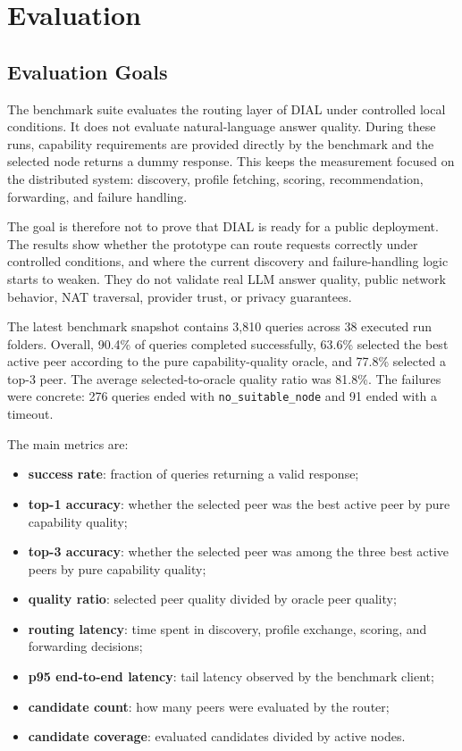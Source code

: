 \section{Evaluation}

\subsection{Evaluation Goals}

The benchmark suite evaluates the routing layer of DIAL under controlled local
conditions. It does not evaluate natural-language answer quality. During these
runs, capability requirements are provided directly by the benchmark and the
selected node returns a dummy response. This keeps the measurement focused on
the distributed system: discovery, profile fetching, scoring, recommendation,
forwarding, and failure handling.

The goal is therefore not to prove that DIAL is ready for a public deployment.
The results show whether the prototype can route requests correctly under
controlled conditions, and where the current discovery and failure-handling
logic starts to weaken. They do not validate real LLM answer quality, public
network behavior, NAT traversal, provider trust, or privacy guarantees.

The latest benchmark snapshot contains 3,810 queries across 38 executed run
folders. Overall, 90.4\% of queries completed successfully, 63.6\% selected the
best active peer according to the pure capability-quality oracle, and 77.8\%
selected a top-3 peer. The average selected-to-oracle quality ratio was
81.8\%.
The failures were concrete: 276 queries ended with \texttt{no\_suitable\_node}
and 91 ended with a timeout.

The main metrics are:

\begin{itemize}
  \item \textbf{success rate}: fraction of queries returning a valid response;
  \item \textbf{top-1 accuracy}: whether the selected peer was the best active
  peer by pure capability quality;
  \item \textbf{top-3 accuracy}: whether the selected peer was among the three
  best active peers by pure capability quality;
  \item \textbf{quality ratio}: selected peer quality divided by oracle peer
  quality;
  \item \textbf{routing latency}: time spent in discovery, profile exchange,
  scoring, and forwarding decisions;
  \item \textbf{p95 end-to-end latency}: tail latency observed by the benchmark
  client;
  \item \textbf{candidate count}: how many peers were evaluated by the router;
  \item \textbf{candidate coverage}: evaluated candidates divided by active
  nodes.
\end{itemize}

